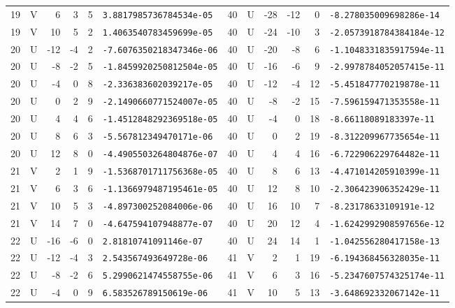 \begin{longtable}{rcrrrl|rcrrrl}
19 & V & 6 & 3 & 5 & \texttt{3.8817985736784534e-05} & 40 & U & -28 & -12 & 0 & \texttt{-8.278035009698286e-14}\\
19 & V & 10 & 5 & 2 & \texttt{1.4063540783459699e-05} & 40 & U & -24 & -10 & 3 & \texttt{-2.0573918784384184e-12}\\
20 & U & -12 & -4 & 2 & \texttt{-7.6076350218347346e-06} & 40 & U & -20 & -8 & 6 & \texttt{-1.1048331835917594e-11}\\
20 & U & -8 & -2 & 5 & \texttt{-1.8459920250812504e-05} & 40 & U & -16 & -6 & 9 & \texttt{-2.9978784052057415e-11}\\
20 & U & -4 & 0 & 8 & \texttt{-2.336383602039217e-05} & 40 & U & -12 & -4 & 12 & \texttt{-5.451847770219878e-11}\\
20 & U & 0 & 2 & 9 & \texttt{-2.1490660771524007e-05} & 40 & U & -8 & -2 & 15 & \texttt{-7.596159471353558e-11}\\
20 & U & 4 & 4 & 6 & \texttt{-1.4512848292369518e-05} & 40 & U & -4 & 0 & 18 & \texttt{-8.66118089183397e-11}\\
20 & U & 8 & 6 & 3 & \texttt{-5.567812349470171e-06} & 40 & U & 0 & 2 & 19 & \texttt{-8.312209967735654e-11}\\
20 & U & 12 & 8 & 0 & \texttt{-4.4905503264804876e-07} & 40 & U & 4 & 4 & 16 & \texttt{-6.722906229764482e-11}\\
21 & V & 2 & 1 & 9 & \texttt{-1.5368701711756368e-05} & 40 & U & 8 & 6 & 13 & \texttt{-4.471014205910399e-11}\\
21 & V & 6 & 3 & 6 & \texttt{-1.1366979487195461e-05} & 40 & U & 12 & 8 & 10 & \texttt{-2.306423906352429e-11}\\
21 & V & 10 & 5 & 3 & \texttt{-4.897300252084006e-06} & 40 & U & 16 & 10 & 7 & \texttt{-8.23178633109191e-12}\\
21 & V & 14 & 7 & 0 & \texttt{-4.647594107948877e-07} & 40 & U & 20 & 12 & 4 & \texttt{-1.6242992908597656e-12}\\
22 & U & -16 & -6 & 0 & \texttt{2.81810741091146e-07} & 40 & U & 24 & 14 & 1 & \texttt{-1.042556280417158e-13}\\
22 & U & -12 & -4 & 3 & \texttt{2.543567493649728e-06} & 41 & V & 2 & 1 & 19 & \texttt{-6.194368456328035e-11}\\
22 & U & -8 & -2 & 6 & \texttt{5.2990621474558755e-06} & 41 & V & 6 & 3 & 16 & \texttt{-5.2347607574325174e-11}\\
22 & U & -4 & 0 & 9 & \texttt{6.583526789150619e-06} & 41 & V & 10 & 5 & 13 & \texttt{-3.648692332067142e-11}\\

\end{longtable}
